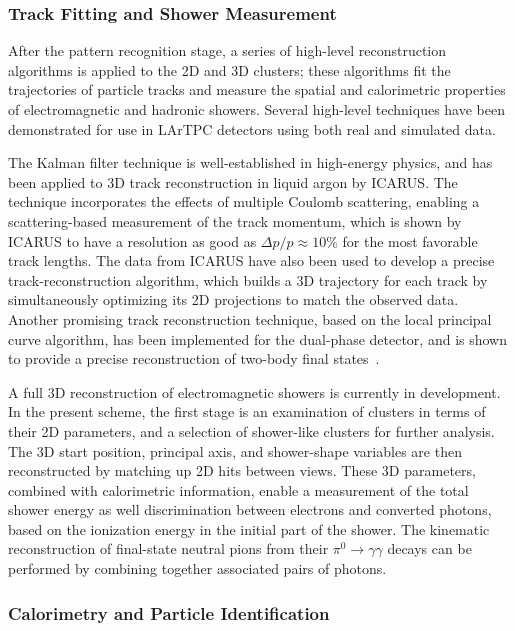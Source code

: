 \subsubsection{Track Fitting and Shower Measurement}

After the pattern recognition stage, a series of high-level
reconstruction algorithms is applied to the 2D and 3D clusters; these algorithms
fit the trajectories of particle tracks and measure the spatial and
calorimetric properties of electromagnetic and hadronic showers.
Several high-level techniques have been demonstrated for use in LArTPC
detectors using both real and simulated data.

The Kalman filter technique\cite{kalman} is well-established in
high-energy physics, and has been applied to 3D track reconstruction
in liquid argon by ICARUS\cite{Ankowski:2006ts}.  The technique
incorporates the effects of multiple Coulomb scattering, enabling a
scattering-based measurement of the track momentum, which is shown by
ICARUS to have a resolution as good as $\Delta p/p \approx 10\%$ for
the most favorable track lengths.  The data from ICARUS have also
been used to develop a precise track-reconstruction algorithm, which
builds a 3D trajectory for each track by simultaneously optimizing its
2D projections to match the observed data\cite{Antonello:2012hu}.
Another promising track reconstruction technique, based on the local
principal curve algorithm, has been implemented for the dual-phase
detector, and is shown to provide a precise reconstruction of two-body
final states~\cite{Back:2013cva,LAGUNA-LBNO-deliv}.

A full 3D reconstruction of electromagnetic showers is currently in
development.  In the present scheme, the first stage is an examination
of clusters in terms of their 2D parameters, and a selection of
shower-like clusters for further analysis. The 3D start position,
principal axis, and shower-shape variables are then reconstructed by
matching up 2D hits between views.  These 3D parameters, combined with
calorimetric information, enable a measurement of the total shower
energy as well discrimination between electrons and converted photons,
based on the ionization energy in the initial part of the shower. The
kinematic reconstruction of final-state neutral pions from their
$\pi^{0} \rightarrow \gamma\gamma$ decays can be performed by
combining together associated pairs of photons.


\subsubsection{Calorimetry and Particle Identification}

